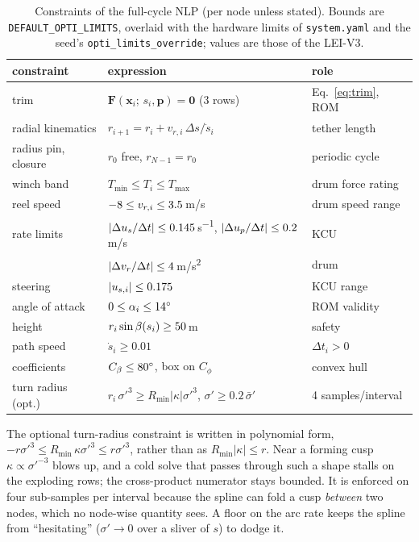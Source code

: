 \documentclass[11pt,a4paper]{article}
\newcommand{\code}[1]{\texttt{\small #1}}
\newcommand{\vect}[1]{\boldsymbol{#1}}
\begin{document}
\begin{table}[H]
  \centering\small
  \caption{Constraints of the full-cycle NLP (per node unless stated). Bounds
  are \code{DEFAULT\_OPTI\_LIMITS}, overlaid with the hardware limits of
  \code{system.yaml} and the seed's \code{opti\_limits\_override}; values are
  those of the LEI-V3.}
  \label{tab:constraints}
  \begin{tabular}{lll}
    \toprule
    constraint & expression & role \\
    \midrule
    trim & $\vect F(\vect x_i;\,s_i,\vect p)=\vect 0$ (3 rows) & Eq.~\eqref{eq:trim}, ROM \\
    radial kinematics & $r_{i+1}=r_i+v_{r,i}\,\Delta s/\dot s_i$ & tether length \\
    radius pin, closure & $r_0$ free, $r_{N-1}=r_0$ & periodic cycle \\
    winch band & $T_{\min}\le T_i\le T_{\max}$ & drum force rating \\
    reel speed & $-8\le v_{r,i}\le3.5$\,\si{m/s} & drum speed range \\
    rate limits & $|\Delta u_s/\Delta t|\le0.145$\,\si{s^{-1}},
      $|\Delta u_p/\Delta t|\le0.2$\,\si{m/s} & KCU \\
     & $|\Delta v_r/\Delta t|\le4$\,\si{m/s^2} & drum \\
    steering & $|u_{s,i}|\le0.175$ & KCU range \\
    angle of attack & $0\le\alpha_i\le14^\circ$ & ROM validity \\
    height & $r_i\sin\beta(s_i)\ge50$\,\si{m} & safety \\
    path speed & $\dot s_i\ge 0.01$ & $\Delta t_i>0$ \\
    coefficients & $C_\beta\le80^\circ$, box on $C_\phi$ & convex hull \\
    turn radius (opt.) & $r_i\,\sigma'^3\ge R_{\min}|\kappa|\sigma'^3$, $\sigma'\ge0.2\,\bar\sigma'$ & 4 samples/interval \\
    \bottomrule
  \end{tabular}
\end{table}

The optional turn-radius constraint is written in polynomial form,
$-r\sigma'^3\le R_{\min}\,\kappa\sigma'^3\le r\sigma'^3$, rather than as
$R_{\min}|\kappa|\le r$. Near a forming cusp $\kappa\propto\sigma'^{-3}$ blows
up, and a cold solve that passes through such a shape stalls on the exploding
rows; the cross-product numerator stays bounded. It is enforced on four
sub-samples per interval because the spline can fold a cusp \emph{between}
two nodes, which no node-wise quantity sees. A floor on the arc rate keeps the
spline from ``hesitating'' ($\sigma'\to0$ over a sliver of $s$) to dodge it.
\end{document}
